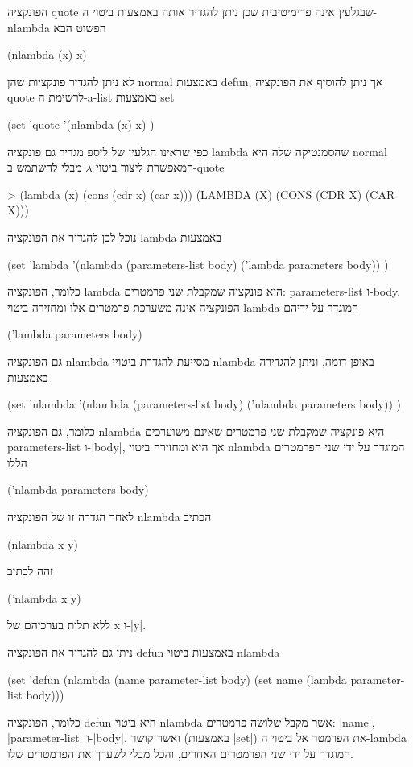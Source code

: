 \documentclass[a4paper,12pt,reqno]{article}
\begin{document}
הפונקציה quote שבגלעין אינה פרימיטיבית שכן ניתן להגדיר אותה באמצעות ביטוי
ה-nlambda הפשוט הבא
\begin{LISP}
(nlambda (x) x)
\end{LISP}
לא ניתן להגדיר פונקציות שהן normal באמצעות defun, אך ניתן להוסיף את הפונקציה
quote לרשימת ה-a-list באמצעות set
\begin{LISP}
(set 'quote
    '(nlambda (x) x)
)
\end{LISP}
כפי שראינו הגלעין של ליספ מגדיר גם פונקציה lambda שהסמנטיקה שלה היא normal
המאפשרת ליצור ביטוי $λ$ מבלי להשתמש ב-quote
\begin{LISP}
> (lambda (x) (cons (cdr x) (car x)))
(LAMBDA (X) (CONS (CDR X) (CAR X)))
\end{LISP}
נוכל לכן להגדיר את הפונקציה lambda באמצעות
\begin{LISP}
(set 'lambda
  '(nlambda (parameters-list body)  ('lambda  parameters body))
)
\end{LISP}
כלומר, הפונקציה lambda היא פונקציה שמקבלת שני פרמטרים: parameters-list
ו-body. הפונקציה אינה משערכת פרמטרים אלו ומחזירה ביטוי lambda המוגדר על ידיהם
\begin{LISP}
  ('lambda  parameters body)
\end{LISP}
גם הפונקציה nlambda מסייעת להגדרת ביטויי nlambda באופן דומה, וניתן להגדירה
באמצעות
\begin{LISP}
(set 'nlambda
  '(nlambda (parameters-list body)  ('nlambda  parameters body))
)
\end{LISP}
כלומר, גם הפונקציה nlambda היא פונקציה שמקבלת שני פרמטרים שאינם משוערכים
parameters-list ו-\E|body|, אך היא ומחזירה ביטוי nlambda המוגדר על ידי
שני הפרמטרים הללו
\begin{LISP}
  ('nlambda parameters body)
\end{LISP}
לאחר הגדרה זו של הפונקציה nlambda הכתיב
\begin{LISP}
  (nlambda x y)
\end{LISP}
זהה לכתיב
\begin{LISP}
  ('nlambda x y)
\end{LISP}
ללא תלות בערכיהם של x ו-\E|y|.

ניתן גם להגדיר את הפונקציה defun באמצעות ביטוי nlambda
\begin{LISP}
(set 'defun
  (nlambda (name parameter-list body)  
      (set name (lambda parameter-list body)))
\end{LISP}
כלומר, הפונקציה defun היא ביטוי nlambda אשר מקבל שלושה פרמטרים: \E|name|,
\E|parameter-list| ו-\E|body|, ואשר קושר (באמצעות \E|set|) את הפרמטר אל ביטוי
ה-lambda המוגדר על ידי שני הפרמטרים האחרים, והכל מבלי לשערך את הפרמטרים שלו.
\end{document}
